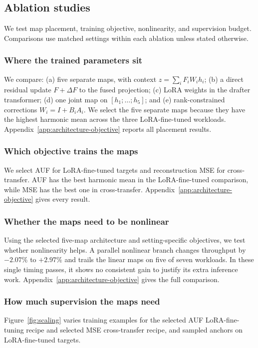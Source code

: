 \subsection{Ablation studies}
\label{sec:ablations}
We test map placement, training objective, nonlinearity, and supervision budget. Comparisons use matched settings within each ablation unless stated otherwise.

\subsubsection{Where the trained parameters sit}
\label{sec:ablation-placement}
We compare: (a) five separate maps, with context $z=\sum_i F_iW_i h_i$; (b) a direct residual update $F+\Delta F$ to the fused projection; (c) LoRA weights in the drafter transformer; (d) one joint map on $[h_1;\ldots;h_5]$; and (e) rank-constrained corrections $W_i=I+B_iA_i$. We select the five separate maps because they have the highest harmonic mean across the three LoRA-fine-tuned workloads. Appendix~\ref{app:architecture-objective} reports all placement results.

\subsubsection{Which objective trains the maps}
\label{sec:ablation-objective}
We select AUF for LoRA-fine-tuned targets and reconstruction MSE for cross-transfer. AUF has the best harmonic mean in the LoRA-fine-tuned comparison, while MSE has the best one in cross-transfer. Appendix~\ref{app:architecture-objective} gives every result.


\subsubsection{Whether the maps need to be nonlinear}
\label{sec:ablation-capacity}
Using the selected five-map architecture and setting-specific objectives, we test whether nonlinearity helps. A parallel nonlinear branch changes throughput by $-2.07\%$ to $+2.97\%$ and trails the linear maps on five of seven workloads. In these single timing passes, it shows no consistent gain to justify its extra inference work. Appendix~\ref{app:architecture-objective} gives the full comparison.

\subsubsection{How much supervision the maps need}
\label{sec:ablation-budget}
Figure~\ref{fig:scaling} varies training examples for the selected AUF LoRA-fine-tuning recipe and selected MSE cross-transfer recipe, and sampled anchors on LoRA-fine-tuned targets.

